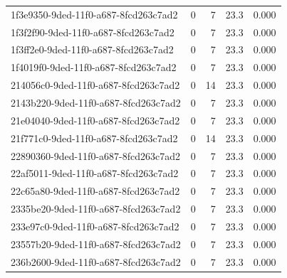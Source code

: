 \begin{longtable}{l r r r r}
1f3e9350-9ded-11f0-a687-8fcd263c7ad2 & 0 & 7 & 23.3 & 0.000 \\

1f3f2f90-9ded-11f0-a687-8fcd263c7ad2 & 0 & 7 & 23.3 & 0.000 \\

1f3ff2e0-9ded-11f0-a687-8fcd263c7ad2 & 0 & 7 & 23.3 & 0.000 \\

1f4019f0-9ded-11f0-a687-8fcd263c7ad2 & 0 & 7 & 23.3 & 0.000 \\

214056c0-9ded-11f0-a687-8fcd263c7ad2 & 0 & 14 & 23.3 & 0.000 \\

2143b220-9ded-11f0-a687-8fcd263c7ad2 & 0 & 7 & 23.3 & 0.000 \\

21e04040-9ded-11f0-a687-8fcd263c7ad2 & 0 & 7 & 23.3 & 0.000 \\

21f771c0-9ded-11f0-a687-8fcd263c7ad2 & 0 & 14 & 23.3 & 0.000 \\

22890360-9ded-11f0-a687-8fcd263c7ad2 & 0 & 7 & 23.3 & 0.000 \\

22af5011-9ded-11f0-a687-8fcd263c7ad2 & 0 & 7 & 23.3 & 0.000 \\

22c65a80-9ded-11f0-a687-8fcd263c7ad2 & 0 & 7 & 23.3 & 0.000 \\

2335be20-9ded-11f0-a687-8fcd263c7ad2 & 0 & 7 & 23.3 & 0.000 \\

233e97c0-9ded-11f0-a687-8fcd263c7ad2 & 0 & 7 & 23.3 & 0.000 \\

23557b20-9ded-11f0-a687-8fcd263c7ad2 & 0 & 7 & 23.3 & 0.000 \\

236b2600-9ded-11f0-a687-8fcd263c7ad2 & 0 & 7 & 23.3 & 0.000 \\

\end{longtable}



